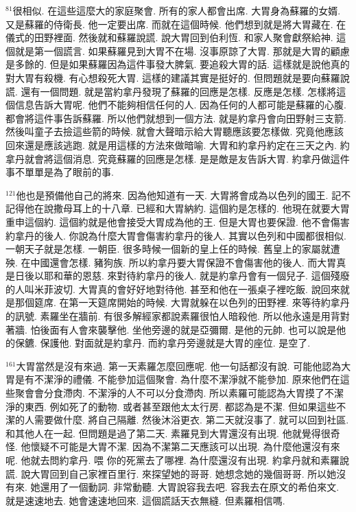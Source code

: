 \documentclass{book}
\begin{document}
$^{81}$很相似.
在這些這麼大的家庭聚會.
所有的家人都會出席.
大胃身為蘇羅的女婿.
又是蘇羅的侍衛長.
他一定要出席.
而就在這個時候.
他們想到就是將大胃藏在.
在儀式的田野裡面.
然後就和蘇羅說謊.
說大胃回到伯利恆.
和家人聚會獻祭給神.
這個就是第一個謊言.
如果蘇羅見到大胃不在場.
沒事原諒了大胃.
那就是大胃的顧慮是多餘的.
但是如果蘇羅因為這件事發大脾氣.
要追殺大胃的話.
這樣就是說他真的對大胃有殺機.
有心想殺死大胃.
這樣的建議其實是挺好的.
但問題就是要向蘇羅說謊.
還有一個問題.
就是當約拿丹發現了蘇羅的回應是怎樣.
反應是怎樣.
怎樣將這個信息告訴大胃呢.
他們不能夠相信任何的人.
因為任何的人都可能是蘇羅的心腹.
都會將這件事告訴蘇羅.
所以他們就想到一個方法.
就是約拿丹會向田野射三支箭.
然後叫童子去撿這些箭的時候.
就會大聲暗示給大胃聽應該要怎樣做.
究竟他應該回來還是應該逃跑.
就是用這樣的方法來做暗喻.
大胃和約拿丹約定在三天之內.
約拿丹就會將這個消息.
究竟蘇羅的回應是怎樣.
是是敵是友告訴大胃.
約拿丹做這件事不單單是為了眼前的事.

$^{121}$他也是預備他自己的將來.
因為他知道有一天.
大胃將會成為以色列的國王.
記不記得他在說撒母耳上的十八章.
已經和大胃納約.
這個約是怎樣的.
他現在就要大胃重申這個約.
這個約就是他會接受大胃成為他的王.
但是大胃也要保證.
他不會傷害約拿丹的後人.
你說為什麼大胃會傷害約拿丹的後人.
其實以色列和中國都很相似.
一朝天子就是怎樣.
一朝臣.
很多時候一個新的皇上任的時候.
舊皇上的家屬就遭殃.
在中國還會怎樣.
豬狗族.
所以約拿丹要大胃保證不會傷害他的後人.
而大胃真是日後以耶和華的恩慈.
來對待約拿丹的後人.
就是約拿丹會有一個兒子.
這個殘廢的人叫米菲波切.
大胃真的會好好地對待他.
甚至和他在一張桌子裡吃飯.
說回來就是那個筵席.
在第一天筵席開始的時候.
大胃就躲在以色列的田野裡.
來等待約拿丹的訊號.
素羅坐在牆前.
有很多解經家都說素羅很怕人暗殺他.
所以他永遠是用背對著牆.
怕後面有人會來襲擊他.
坐他旁邊的就是亞彌爾.
是他的元帥.
也可以說是他的保鑣.
保護他.
對面就是約拿丹.
而約拿丹旁邊就是大胃的座位.
是空了.

$^{161}$大胃當然是沒有來過.
第一天素羅怎麼回應呢.
他一句話都沒有說.
可能他認為大胃是有不潔淨的禮儀.
不能參加這個聚會.
為什麼不潔淨就不能參加.
原來他們在這些聚會會分食滯肉.
不潔淨的人不可以分食滯肉.
所以素羅可能認為大胃摸了不潔淨的東西.
例如死了的動物.
或者甚至跟他太太行房.
都認為是不潔.
但如果這些不潔的人需要做什麼.
將自己隔離.
然後沐浴更衣.
第二天就沒事了.
就可以回到社區.
和其他人在一起.
但問題是過了第二天.
素羅見到大胃還沒有出現.
他就覺得很奇怪.
他懷疑不可能是大胃不潔.
因為不潔第二天應該可以出現.
為什麼他還沒有來呢.
他就去問約拿丹.
喂 你的死黨去了哪裡.
為什麼還沒有出現.
約拿丹就和素羅說謊.
說大胃回到自己家裡百里行.
來探望她的哥哥.
她想念她的幾個哥哥.
所以她沒有來.
她還用了一個動詞.
非常動聽.
大胃說容我去吧.
容我去在原文的希伯來文.
就是速速地去.
她會速速地回來.
這個謊話天衣無縫.
但素羅相信嗎.
\end{document}
